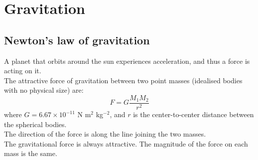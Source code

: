 \documentclass[a4paper,12pt]{article}
\begin{document}
\section{Gravitation}
\subsection{Newton's law of gravitation}
A planet that orbits around the sun experiences acceleration, and thus a force is acting on it.\\
The attractive force of gravitation between two point masses (idealised bodies with no physical size) are:
\[F=G\dfrac{M_1M_2}{r^2}\]
where $G=6.67\times 10^{-11}$ N m$^2$ kg$^{-2}$, and $r$ is the center-to-center distance between the spherical bodies.\\
The direction of the force is along the line joining the two masses.\\
The gravitational force is always attractive. The magnitude of the force on each mass is the same.
\end{document}
